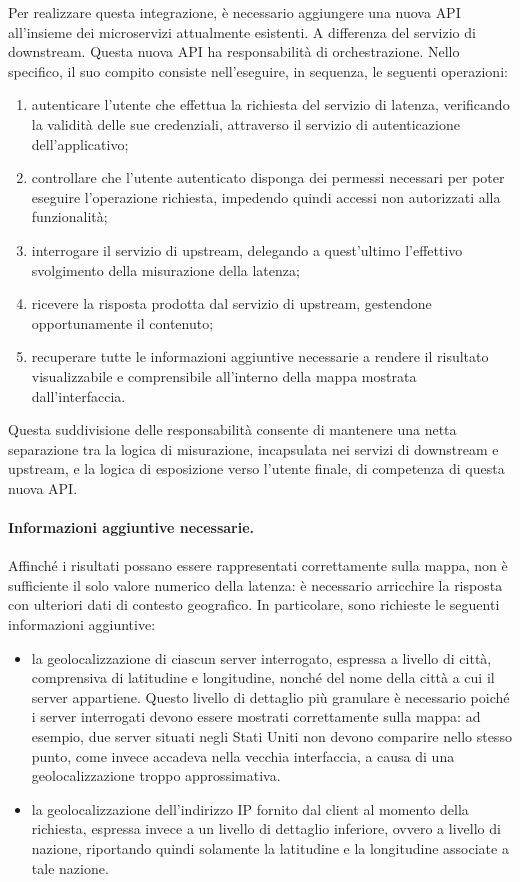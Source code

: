 Per realizzare questa integrazione, è necessario aggiungere una nuova \ac{API} all'insieme dei microservizi attualmente esistenti. A differenza del servizio di downstream. Questa nuova \ac{API} ha responsabilità di orchestrazione. Nello specifico, il suo compito consiste nell'eseguire, in sequenza, le seguenti operazioni:
\begin{enumerate}
    \item autenticare l'utente che effettua la richiesta del servizio di latenza, verificando la validità delle sue credenziali, attraverso il servizio di autenticazione dell'applicativo;
    \item controllare che l'utente autenticato disponga dei permessi necessari per poter eseguire l'operazione richiesta, impedendo quindi accessi non autorizzati alla funzionalità;
    \item interrogare il servizio di upstream, delegando a quest'ultimo l'effettivo svolgimento della misurazione della latenza;
    \item ricevere la risposta prodotta dal servizio di upstream, gestendone opportunamente il contenuto;
    \item recuperare tutte le informazioni aggiuntive necessarie a rendere il risultato visualizzabile e comprensibile all'interno della mappa mostrata dall'interfaccia.
\end{enumerate}
Questa suddivisione delle responsabilità consente di mantenere una netta separazione tra la logica di misurazione, incapsulata nei servizi di downstream e upstream, e la logica di esposizione verso l'utente finale, di competenza di questa nuova \ac{API}.

\paragraph{Informazioni aggiuntive necessarie.}
Affinché i risultati possano essere rappresentati correttamente sulla mappa, non è sufficiente il solo valore numerico della latenza: è necessario arricchire la risposta con ulteriori dati di contesto geografico. In particolare, sono richieste le seguenti informazioni aggiuntive:
\begin{itemize}
    \item la geolocalizzazione di ciascun server interrogato, espressa a livello di città, comprensiva di latitudine e longitudine, nonché del nome della città a cui il server appartiene. Questo livello di dettaglio più granulare è necessario poiché i server interrogati devono essere mostrati correttamente sulla mappa: ad esempio, due server situati negli Stati Uniti non devono comparire nello stesso punto, come invece accadeva nella vecchia interfaccia, a causa di una geolocalizzazione troppo approssimativa.
    \item la geolocalizzazione dell'indirizzo IP fornito dal client al momento della richiesta, espressa invece a un livello di dettaglio inferiore, ovvero a livello di nazione, riportando quindi solamente la latitudine e la longitudine associate a tale nazione.
\end{itemize}

